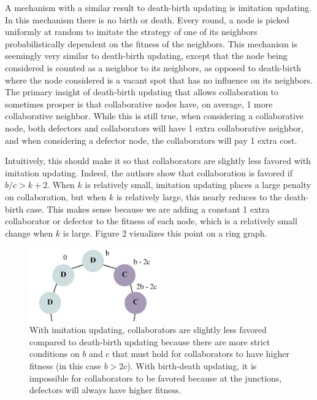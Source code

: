 \documentclass[11pt]{article}
\begin{document}
A mechanism with a similar result to death-birth updating is imitation updating. In this mechanism there is no birth or death. Every round, a node is picked uniformly at random to imitate the strategy of one of its neighbors probabilistically dependent on the fitness of the neighbors. This mechanism is seemingly very similar to death-birth updating, except that the node being considered is counted as a neighbor to its neighbors, as opposed to death-birth where the node considered is a vacant spot that has no influence on its neighbors. The primary insight of death-birth updating that allows collaboration to sometimes prosper is that collaborative nodes have, on average, 1 more collaborative neighbor. While this is still true, when considering a collaborative node, both defectors and collaborators will have 1 extra collaborative neighbor, and when considering a defector node, the collaborators will pay 1 extra cost. 

Intuitively, this should make it so that collaborators are slightly less favored with imitation updating. Indeed, the authors show that collaboration is favored if $b / c > k + 2$. When $k$ is relatively small, imitation updating places a large penalty on collaboration, but when $k$ is relatively large, this nearly reduces to the death-birth case. This makes sense because we are adding a constant 1 extra collaborator or defector to the fitness of each node, which is a relatively small change when $k$ is large. Figure 2 visualizes this point on a ring graph. 

\begin{figure}[htbp]
    \centering    \includegraphics[width=0.5\textwidth]{figures/other-mech.png}
    \caption{With imitation updating, collaborators are slightly less favored compared to death-birth updating because there are more strict conditions on $b$ and $c$ that must hold for collaborators to have higher fitness (in this case $b > 2c$). With birth-death updating, it is impossible for collaborators to be favored because at the junctions, defectors will always have higher fitness. }
    \label{fig:other-mech}
\end{figure}
\end{document}
